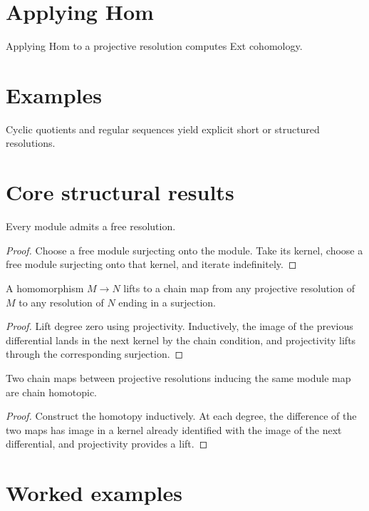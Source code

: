 \section{Applying Hom}
Applying Hom to a projective resolution computes Ext cohomology.

\section{Examples}
Cyclic quotients and regular sequences yield explicit short or structured resolutions.

\section{Core structural results}

\begin{theorem}\label{thm:v23-01}
Every module admits a free resolution.
\begin{proof}
Choose a free module surjecting onto the module. Take its kernel, choose a free module surjecting onto that kernel, and iterate indefinitely.
\end{proof}
\end{theorem}

\begin{theorem}\label{thm:v23-02}
A homomorphism $M\to N$ lifts to a chain map from any projective resolution of $M$ to any resolution of $N$ ending in a surjection.
\begin{proof}
Lift degree zero using projectivity. Inductively, the image of the previous differential lands in the next kernel by the chain condition, and projectivity lifts through the corresponding surjection.
\end{proof}
\end{theorem}

\begin{theorem}\label{thm:v23-03}
Two chain maps between projective resolutions inducing the same module map are chain homotopic.
\begin{proof}
Construct the homotopy inductively. At each degree, the difference of the two maps has image in a kernel already identified with the image of the next differential, and projectivity provides a lift.
\end{proof}
\end{theorem}

\section{Worked examples}

